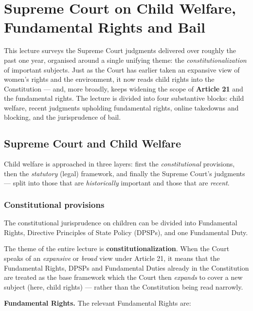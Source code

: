 \chapter{Supreme Court on Child Welfare, Fundamental Rights and Bail}
\label{ch:sc-child-welfare-fundamental-rights-bail}

This lecture surveys the Supreme Court judgments delivered over roughly the past one
year, organised around a single unifying theme: the \emph{constitutionalization} of
important subjects. Just as the Court has earlier taken an expansive view of women's
rights and the environment, it now reads child rights into the Constitution — and, more
broadly, keeps widening the scope of \textbf{Article 21} and the fundamental rights.
The lecture is divided into four substantive blocks: child welfare, recent judgments
upholding fundamental rights, online takedowns and blocking, and the jurisprudence of
bail.

\section{Supreme Court and Child Welfare}
\label{sec:child-welfare}

Child welfare is approached in three layers: first the \emph{constitutional}
provisions, then the \emph{statutory} (legal) framework, and finally the Supreme Court's
judgments — split into those that are \emph{historically} important and those that are
\emph{recent}.

\subsection{Constitutional provisions}

The constitutional jurisprudence on children can be divided into Fundamental Rights,
Directive Principles of State Policy (DPSPs), and one Fundamental Duty.

\begin{KeyConcept}
The theme of the entire lecture is \textbf{constitutionalization}. When the Court speaks
of an \emph{expansive} or \emph{broad} view under Article 21, it means that the
Fundamental Rights, DPSPs and Fundamental Duties already in the Constitution are
treated as the base framework which the Court then \emph{expands} to cover a new subject
(here, child rights) — rather than the Constitution being read narrowly.
\end{KeyConcept}

\textbf{Fundamental Rights.} The relevant Fundamental Rights are:


